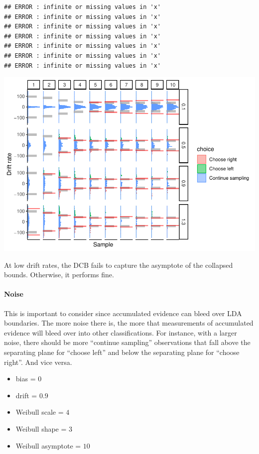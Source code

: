\documentclass[
]{book}
\providecommand{\tightlist}{%
  \setlength{\itemsep}{0pt}\setlength{\parskip}{0pt}}
\begin{document}
\begin{verbatim}
## ERROR : infinite or missing values in 'x' 
## ERROR : infinite or missing values in 'x' 
## ERROR : infinite or missing values in 'x' 
## ERROR : infinite or missing values in 'x' 
## ERROR : infinite or missing values in 'x' 
## ERROR : infinite or missing values in 'x' 
## ERROR : infinite or missing values in 'x'
\end{verbatim}

\includegraphics{LateNightBayes_files/figure-latex/unnamed-chunk-11-1.pdf}

At low drift rates, the DCB fails to capture the asymptote of the collapsed bounds. Otherwise, it performs fine.

\hypertarget{noise-1}{%
\paragraph*{Noise}\label{noise-1}}

This is important to consider since accumulated evidence can bleed over LDA boundaries. The more noise there is, the more that measurements of accumulated evidence will bleed over into other classifications. For instance, with a larger noise, there should be more ``continue sampling'' observations that fall above the separating plane for ``choose left'' and below the separating plane for ``choose right''. And vice versa.

\begin{itemize}
\tightlist
\item
  bias = \(0\)
\item
  drift = \(0.9\)
\item
  Weibull scale = \(4\)
\item
  Weibull shape = \(3\)
\item
  Weibull asymptote = \(10\)
\end{itemize}
\end{document}
